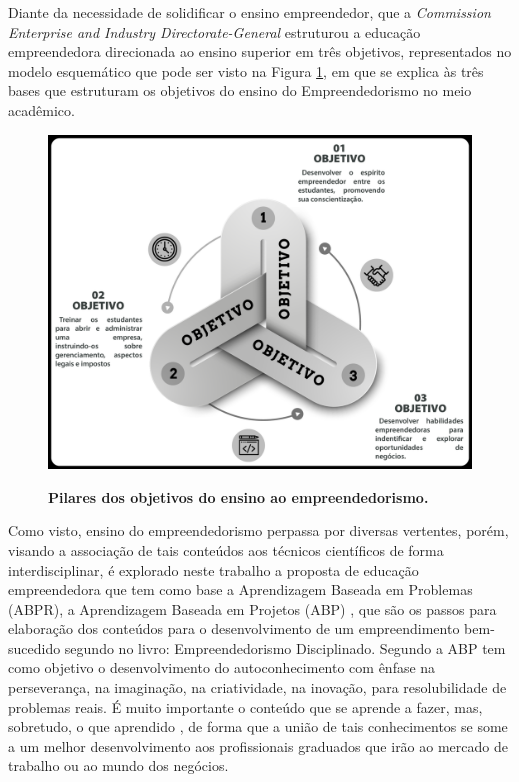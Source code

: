 Diante da necessidade de solidificar o ensino empreendedor, que a \textit{Commission Enterprise and Industry Directorate-General} \cite{european_commission_best_2008} estruturou a educação empreendedora direcionada ao ensino superior em três objetivos, representados no modelo esquemático que pode ser visto na Figura \ref{figura_3}, em que se explica às três bases que estruturam os objetivos do ensino do Empreendedorismo no meio acadêmico. 

\begin{figure}[H]
\centering
\caption{\textbf{Pilares dos objetivos do ensino ao empreendedorismo.}}
\includegraphics[scale=0.12]{Imagens/objetivos_educacao_empreendedora.png}
\label{figura_3}
\end{figure}

Como visto, ensino do empreendedorismo perpassa por diversas vertentes, porém, visando a associação de tais conteúdos aos técnicos científicos de forma interdisciplinar, é explorado neste trabalho a proposta de educação empreendedora que tem como base a Aprendizagem Baseada em Problemas (ABPR), a Aprendizagem Baseada em Projetos (ABP) \cite{bender_aprendizagem_2015} , que são os passos para elaboração dos conteúdos para o desenvolvimento de um empreendimento bem-sucedido segundo \cite{aulet_empreendedorismo_2019} no livro: Empreendedorismo Disciplinado. 
Segundo \cite{bender_aprendizagem_2015}a ABP tem como objetivo o desenvolvimento do autoconhecimento com ênfase na perseverança, na imaginação, na criatividade, na inovação, para resolubilidade de problemas reais. É muito importante o conteúdo que se aprende a fazer, mas, sobretudo, o que aprendido \cite{souza_disseminacao_2001}, de forma que a união de tais conhecimentos se some a um melhor desenvolvimento aos profissionais graduados que irão ao mercado de trabalho ou ao mundo dos negócios. 

